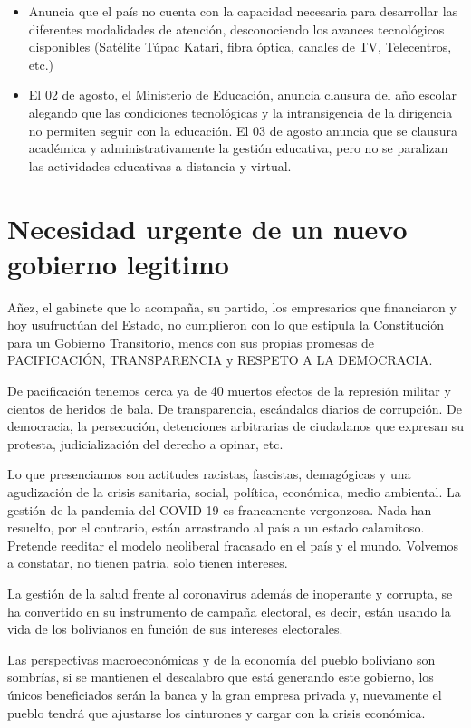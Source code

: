 \documentclass[a4paper, nobind]{templates/ociamthesis}
\begin{document}
\begin{itemize}
\item
  Anuncia que el país no cuenta con la capacidad necesaria para desarrollar las diferentes modalidades de atención, desconociendo los avances tecnológicos disponibles (Satélite Túpac Katari, fibra óptica, canales de TV, Telecentros, etc.)
\item
  El 02 de agosto, el Ministerio de Educación, anuncia clausura del año escolar alegando que las condiciones tecnológicas y la intransigencia de la dirigencia no permiten seguir con la educación. El 03 de agosto anuncia que se clausura académica y administrativamente la gestión educativa, pero no se paralizan las actividades educativas a distancia y virtual.
\end{itemize}

\hypertarget{necesidad-urgente-de-un-nuevo-gobierno-legitimo}{%
\chapter{Necesidad urgente de un nuevo gobierno legitimo}\label{necesidad-urgente-de-un-nuevo-gobierno-legitimo}}

Añez, el gabinete que lo acompaña, su partido, los empresarios que financiaron y hoy usufructúan del Estado, no cumplieron con lo que estipula la Constitución para un Gobierno Transitorio, menos con sus propias promesas de PACIFICACIÓN, TRANSPARENCIA y RESPETO A LA DEMOCRACIA.

De pacificación tenemos cerca ya de 40 muertos efectos de la represión militar y cientos de heridos de bala. De transparencia, escándalos diarios de corrupción. De democracia, la persecución, detenciones arbitrarias de ciudadanos que expresan su protesta, judicialización del derecho a opinar, etc.

Lo que presenciamos son actitudes racistas, fascistas, demagógicas y una agudización de la crisis sanitaria, social, política, económica, medio ambiental. La gestión de la pandemia del COVID 19 es francamente vergonzosa. Nada han resuelto, por el contrario, están arrastrando al país a un estado calamitoso. Pretende reeditar el modelo neoliberal fracasado en el país y el mundo. Volvemos a constatar, no tienen patria, solo tienen intereses.

La gestión de la salud frente al coronavirus además de inoperante y corrupta, se ha convertido en su instrumento de campaña electoral, es decir, están usando la vida de los bolivianos en función de sus intereses electorales.

Las perspectivas macroeconómicas y de la economía del pueblo boliviano son sombrías, si se mantienen el descalabro que está generando este gobierno, los únicos beneficiados serán la banca y la gran empresa privada y, nuevamente el pueblo tendrá que ajustarse los cinturones y cargar con la crisis económica.
\end{document}
